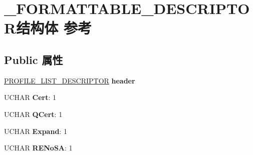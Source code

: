 \hypertarget{struct___f_o_r_m_a_t_t_a_b_l_e___d_e_s_c_r_i_p_t_o_r}{}\section{\+\_\+\+F\+O\+R\+M\+A\+T\+T\+A\+B\+L\+E\+\_\+\+D\+E\+S\+C\+R\+I\+P\+T\+O\+R结构体 参考}
\label{struct___f_o_r_m_a_t_t_a_b_l_e___d_e_s_c_r_i_p_t_o_r}
\subsection*{Public 属性}
\begin{DoxyCompactItemize}
\item 
\mbox{\label{struct___f_o_r_m_a_t_t_a_b_l_e___d_e_s_c_r_i_p_t_o_r_ae7a5c76ee22dfec73953deb143ceee69}} 
\hyperlink{struct___p_r_o_f_i_l_e___l_i_s_t___d_e_s_c_r_i_p_t_o_r}{P\+R\+O\+F\+I\+L\+E\+\_\+\+L\+I\+S\+T\+\_\+\+D\+E\+S\+C\+R\+I\+P\+T\+OR} {\bfseries header}
\item 
\mbox{\label{struct___f_o_r_m_a_t_t_a_b_l_e___d_e_s_c_r_i_p_t_o_r_a00c0f06d07798ff31075b4870954148b}} 
U\+C\+H\+AR {\bfseries Cert}\+: 1
\item 
\mbox{\label{struct___f_o_r_m_a_t_t_a_b_l_e___d_e_s_c_r_i_p_t_o_r_a10dcb1f463fd4dc814d2a63a5fde7a40}} 
U\+C\+H\+AR {\bfseries Q\+Cert}\+: 1
\item 
\mbox{\label{struct___f_o_r_m_a_t_t_a_b_l_e___d_e_s_c_r_i_p_t_o_r_a4ef3650aaa83344510a2bc0283933d1d}} 
U\+C\+H\+AR {\bfseries Expand}\+: 1
\item 
\mbox{\label{struct___f_o_r_m_a_t_t_a_b_l_e___d_e_s_c_r_i_p_t_o_r_ac89c04ff2dbce87edc44b1cc745a957f}} 
U\+C\+H\+AR {\bfseries R\+E\+No\+SA}\+: 1
\item 
\mbox{\label{struct___f_o_r_m_a_t_t_a_b_l_e___d_e_s_c_r_i_p_t_o_r_ac7336567eae05348359bfd28df963e13}} 

\end{DoxyCompactItemize}
